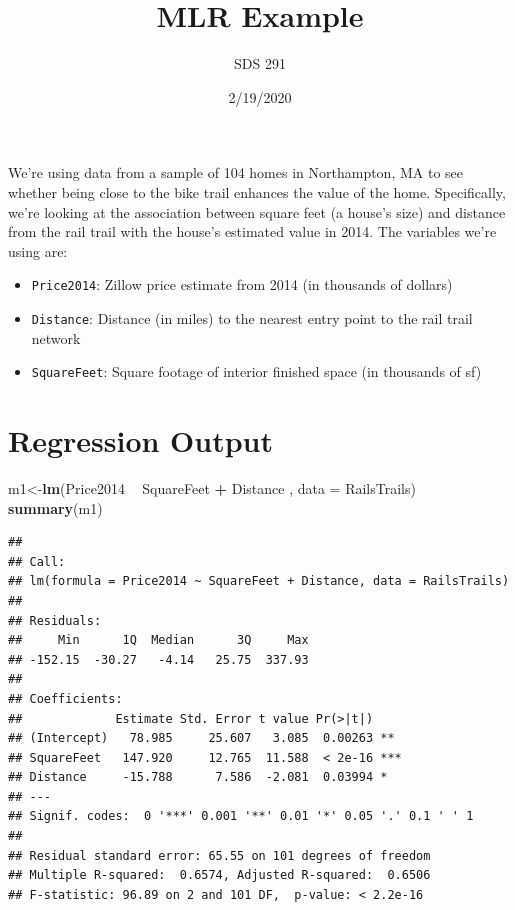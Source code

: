 \documentclass[]{article}
\title{MLR Example}
\author{SDS 291}
\date{2/19/2020}
\newenvironment{Shaded}{\begin{snugshade}}{\end{snugshade}}
\newcommand{\DataTypeTok}[1]{\textcolor[rgb]{0.13,0.29,0.53}{#1}}
\newcommand{\KeywordTok}[1]{\textcolor[rgb]{0.13,0.29,0.53}{\textbf{#1}}}
\newcommand{\NormalTok}[1]{#1}
\newcommand{\OperatorTok}[1]{\textcolor[rgb]{0.81,0.36,0.00}{\textbf{#1}}}
\newcommand{\StringTok}[1]{\textcolor[rgb]{0.31,0.60,0.02}{#1}}
\providecommand{\tightlist}{%
  \setlength{\itemsep}{0pt}\setlength{\parskip}{0pt}}
\begin{document}
\maketitle

We're using data from a sample of 104 homes in Northampton, MA to see
whether being close to the bike trail enhances the value of the home.
Specifically, we're looking at the association between square feet (a
house's size) and distance from the rail trail with the house's
estimated value in 2014. The variables we're using are:

\begin{itemize}
\tightlist
\item
  \texttt{Price2014}: Zillow price estimate from 2014 (in thousands of
  dollars)
\item
  \texttt{Distance}: Distance (in miles) to the nearest entry point to
  the rail trail network
\item
  \texttt{SquareFeet}: Square footage of interior finished space (in
  thousands of sf)
\end{itemize}

\hypertarget{regression-output}{%
\section{Regression Output}\label{regression-output}}

\begin{Shaded}
\begin{Highlighting}[]
\NormalTok{m1<-}\KeywordTok{lm}\NormalTok{(Price2014 }\OperatorTok{~}\StringTok{ }\NormalTok{SquareFeet }\OperatorTok{+}\StringTok{ }\NormalTok{Distance , }\DataTypeTok{data =}\NormalTok{ RailsTrails)}
\KeywordTok{summary}\NormalTok{(m1)}
\end{Highlighting}
\end{Shaded}

\begin{verbatim}
## 
## Call:
## lm(formula = Price2014 ~ SquareFeet + Distance, data = RailsTrails)
## 
## Residuals:
##     Min      1Q  Median      3Q     Max 
## -152.15  -30.27   -4.14   25.75  337.93 
## 
## Coefficients:
##             Estimate Std. Error t value Pr(>|t|)    
## (Intercept)   78.985     25.607   3.085  0.00263 ** 
## SquareFeet   147.920     12.765  11.588  < 2e-16 ***
## Distance     -15.788      7.586  -2.081  0.03994 *  
## ---
## Signif. codes:  0 '***' 0.001 '**' 0.01 '*' 0.05 '.' 0.1 ' ' 1
## 
## Residual standard error: 65.55 on 101 degrees of freedom
## Multiple R-squared:  0.6574, Adjusted R-squared:  0.6506 
## F-statistic: 96.89 on 2 and 101 DF,  p-value: < 2.2e-16
\end{verbatim}
\end{document}
